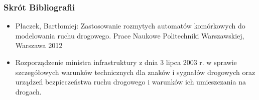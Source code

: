 \documentclass[17pt]{beamer}
\begin{document}
\begin{frame}[shrink=5]
 \frametitle{\vspace{22px}Skrót Bibliografii}
 {\small
 \begin{itemize}
  \item{Płaczek, Bartłomiej: Zastosowanie rozmytych automatów komórkowych do modelowania ruchu drogowego. Prace Naukowe Politechniki Warszawskiej, Warszawa 2012}
  \item{Rozporządzenie ministra infrastruktury z dnia 3 lipca 2003 r. w sprawie szczegółowych warunków technicznych
 dla znaków i sygnałów drogowych oraz urządzeń bezpieczeństwa ruchu drogowego i warunków ich umieszczania na drogach.}
 \end{itemize}
 }
\end{frame}
\end{document}
